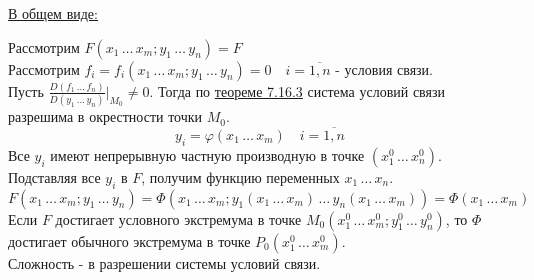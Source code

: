 \documentclass[12pt]{article}
\begin{document}
    \underline{В общем виде:}
    \begin{adjustwidth}{1.5em}{1.5em}
        Рассмотрим $F(x_1\, \dots\, x_m; y_1\, \dots\, y_n) = F$\\
        Рассмотрим $f_i = f_i(x_1\, \dots\, x_m; y_1\, \dots\, y_n) = 0 \quad i = \overline{1, n}$ - условия связи.\\
        Пусть $\frac{D(f_1\, \dots\, f_n)}{D(y_1\, \dots\, y_n)} \Big|_{M_0} \ne 0$. Тогда по \hyperref[th:7.16.3]{теореме 7.16.3} система условий связи разрешима в окрестности точки $M_0$.
        \[ y_i = \varphi (x_1\, \dots\, x_m) \quad i = \overline{1, n} \]
        Все $y_i$ имеют непрерывную частную производную в точке $(x^0_1\, \dots\, x^0_n)$.\\
        Подставляя все $y_i$ в $F$, получим функцию переменных $x_1\, \dots\, x_n$.
        \[ F(x_1\, \dots\, x_m; y_1\, \dots\, y_n) = \Phi (x_1\, \dots\, x_m; y_1(x_1\, \dots\, x_m)\, \dots\, y_n(x_1\, \dots\, x_m)) = \Phi (x_1\, \dots\, x_m) \]
        Если $F$ достигает условного экстремума в точке $M_0 (x^0_1\, \dots\, x^0_m; y^0_1\, \dots\, y^0_n)$, то $\Phi$ достигает обычного экстремума в точке $P_0(x^0_1\, \dots\, x^0_m)$.\\
        Сложность - в разрешении системы условий связи.
    \end{adjustwidth}
\end{document}
